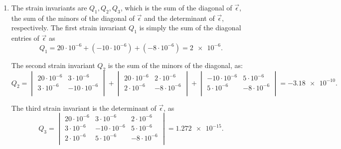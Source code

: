 \begin{derivation}
  \begin{enumerate}
    \item[(a)]   The strain invariants are $Q_1, Q_2, Q_3$, which is the sum of the diagonal of $\Vec{\epsilon}$, the sum of the minors of the diagonal of $\Vec{\epsilon}$ and the determinant of $\Vec{\epsilon}$, respectively.
  The first strain invariant $Q_1$ is simply the sum of the diagonal entries of $\Vec{\epsilon}$ as
  \begin{equation*}
    Q_1 = 20 \cdot 10^{-6} + \left( -10 \cdot 10^{-6} \right) + \left( -8 \cdot 10^{-6} \right)  = \num{2e-6} 
  .\end{equation*}
  
  The second strain invariant $Q_2$ is the sum of the minors of the diagonal, as:
  \begin{equation*}
    Q_2 = \begin{vmatrix}
      20 \cdot 10^{-6} & 3 \cdot 10^{-6}\\
    3 \cdot 10^{-6}& -10 \cdot 10^{-6}\\
    \end{vmatrix} + \begin{vmatrix}
      20 \cdot 10^{-6}& 2\cdot 10^{-6}\\
    2\cdot 10^{-6} & -8\cdot 10^{-6}\\
    \end{vmatrix} + \begin{vmatrix}
      -10 \cdot 10^{-6} & 5 \cdot 10^{-6}\\
    5 \cdot 10^{-6}& -8 \cdot 10^{-6}\\
  \end{vmatrix} = -\num{3.18e-10}
.\end{equation*}
  
  The third strain invariant is the determinant of $\Vec{\epsilon}$, as
  \begin{equation*}
    Q_3 = \begin{vmatrix}
      20 \cdot 10^{-6} & 3 \cdot 10^{-6} & 2 \cdot 10^{-6}\\
    3 \cdot 10^{-6}& -10\cdot 10^{-6} & 5\cdot 10^{-6}\\
    2 \cdot 10^{-6}& 5 \cdot 10^{-6}& -8\cdot 10^{-6}\\
    \end{vmatrix} = \num{1.272e-15}
  .\end{equation*}
  

\end{enumerate}
\end{derivation}
